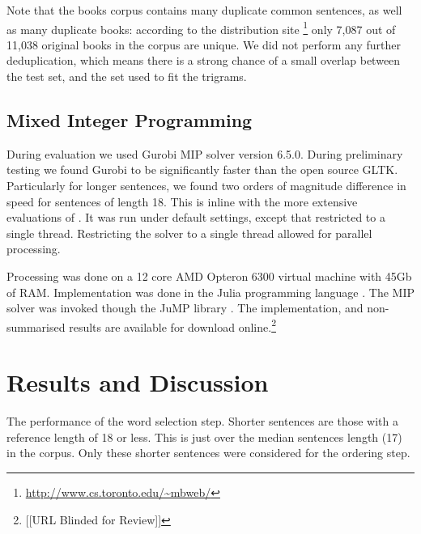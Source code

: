 \documentclass[11pt]{article}
\theoremstyle{plain}
\theoremstyle{definition}
\begin{document}
Note that the books corpus contains many duplicate common sentences, as well as many duplicate books: according to the distribution site \footnote{\url{http://www.cs.toronto.edu/~mbweb/}} only 7,087 out of 11,038 original books in the corpus are unique. We did not perform any further deduplication, which means there is a strong chance of a small overlap between the test set, and the set used to fit the trigrams.
 

\subsection{Mixed Integer Programming}
During evaluation we used Gurobi MIP solver version 6.5.0. During preliminary testing we found Gurobi to be significantly faster than the open source GLTK. Particularly for longer sentences, we found two orders of magnitude difference in speed for sentences of length 18. This is inline with the more extensive evaluations of \textcite{meindl2012analysis}. It was run under default settings, except that restricted to a single thread.
Restricting the solver to a single thread allowed for parallel processing.

Processing was done on a 12 core AMD Opteron 6300 virtual machine with 45Gb of RAM. Implementation was done in the Julia programming language \parencite{Julia}. The MIP solver was invoked though the JuMP library \parencite{jump}. The implementation, and non-summarised results are available for download online.\footnote{[[URL Blinded for Review]]}



\section{Results and Discussion} \label{results}

\begin{table}		
	\caption{ The performance of the word selection step. Shorter sentences are those with a reference length of 18 or less. This is just over the median sentences length (17) in the corpus. Only these shorter sentences were considered for the ordering step.}
	\label{table:overall}
\end{table}
\end{document}
